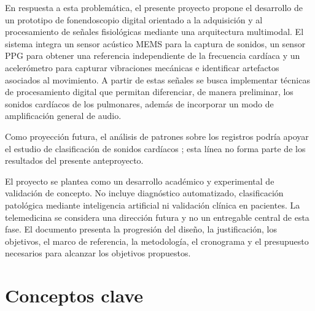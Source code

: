 En respuesta a esta problemática, el presente proyecto propone el desarrollo de un prototipo de fonendoscopio digital orientado a la adquisición y al procesamiento de señales fisiológicas mediante una arquitectura multimodal. El sistema integra un sensor acústico MEMS para la captura de sonidos, un sensor PPG para obtener una referencia independiente de la frecuencia cardíaca y un acelerómetro para capturar vibraciones mecánicas e identificar artefactos asociados al movimiento. A partir de estas señales se busca implementar técnicas de procesamiento digital que permitan diferenciar, de manera preliminar, los sonidos cardíacos de los pulmonares, además de incorporar un modo de amplificación general de audio.

Como proyección futura, el análisis de patrones sobre los registros podría apoyar el estudio de clasificación de sonidos cardíacos ; esta línea no forma parte de los resultados del presente anteproyecto.

El proyecto se plantea como un desarrollo académico y experimental de validación de concepto. No incluye diagnóstico automatizado, clasificación patológica mediante inteligencia artificial ni validación clínica en pacientes. La telemedicina se considera una dirección futura y no un entregable central de esta fase. El documento presenta la progresión del diseño, la justificación, los objetivos, el marco de referencia, la metodología, el cronograma y el presupuesto necesarios para alcanzar los objetivos propuestos.

\section{Conceptos clave}

